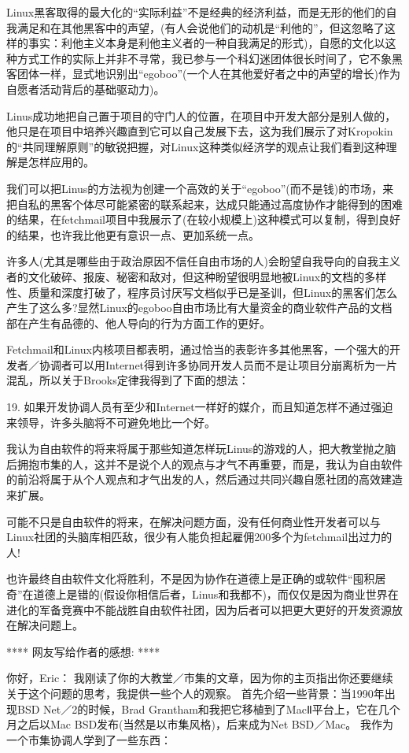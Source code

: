 \documentclass[a4paper,12pt,UTF8,twoside]{ctexbook}
\begin{document}
Linux黑客取得的最大化的“实际利益”不是经典的经济利益，而是无形的他们的自我满足和在其他黑客中的声望，(有人会说他们的动机是“利他的”，但这忽略了这样的事实：利他主义本身是利他主义者的一种自我满足的形式)，自愿的文化以这种方式工作的实际上并非不寻常，我已参与一个科幻迷团体很长时间了，它不象黑客团体一样，显式地识别出“egoboo”(一个人在其他爱好者之中的声望的增长)作为自愿者活动背后的基础驱动力)。


Linus成功地把自己置于项目的守门人的位置，在项目中开发大部分是别人做的，他只是在项目中培养兴趣直到它可以自己发展下去，这为我们展示了对Kropokin的“共同理解原则”的敏锐把握，对Linux这种类似经济学的观点让我们看到这种理解是怎样应用的。


我们可以把Linus的方法视为创建一个高效的关于“egoboo”(而不是钱)的市场，来把自私的黑客个体尽可能紧密的联系起来，达成只能通过高度协作才能得到的困难的结果，在fetchmail项目中我展示了(在较小规模上)这种模式可以复制，得到良好的结果，也许我比他更有意识一点、更加系统一点。


许多人(尤其是哪些由于政治原因不信任自由市场的人)会盼望自我导向的自我主义者的文化破碎、报废、秘密和敌对，但这种盼望很明显地被Linux的文档的多样性、质量和深度打破了，程序员讨厌写文档似乎已是圣训，但Linux的黑客们怎么产生了这么多?显然Linux的egoboo自由市场比有大量资金的商业软件产品的文档部在产生有品德的、他人导向的行为方面工作的更好。


Fetchmail和Linux内核项目都表明，通过恰当的表彰许多其他黑客，一个强大的开发者／协调者可以用Internet得到许多协同开发人员而不是让项目分崩离析为一片混乱，所以关于Brooks定律我得到了下面的想法：


19. 如果开发协调人员有至少和Internet一样好的媒介，而且知道怎样不通过强迫来领导，许多头脑将不可避免地比一个好。


我认为自由软件的将来将属于那些知道怎样玩Linus的游戏的人，把大教堂抛之脑后拥抱市集的人，这并不是说个人的观点与才气不再重要，而是，我认为自由软件的前沿将属于从个人观点和才气出发的人，然后通过共同兴趣自愿社团的高效建造来扩展。


可能不只是自由软件的将来，在解决问题方面，没有任何商业性开发者可以与Linux社团的头脑库相匹敌，很少有人能负担起雇佣200多个为fetchmail出过力的人!


也许最终自由软件文化将胜利，不是因为协作在道德上是正确的或软件“囤积居奇”在道德上是错的(假设你相信后者，Linus和我都不)，而仅仅是因为商业世界在进化的军备竞赛中不能战胜自由软件社团，因为后者可以把更大更好的开发资源放在解决问题上。

**** 网友写给作者的感想: ****

你好，Eric：
我刚读了你的大教堂／市集的文章，因为你的主页指出你还要继续关于这个问题的思考，我提供一些个人的观察。 首先介绍一些背景：当1990年出现BSD Net／2的时候，Brad Grantham和我把它移植到了MacⅡ平台上，它在几个月之后以Mac BSD发布(当然是以市集风格)，后来成为Net BSD／Mac。 我作为一个市集协调人学到了一些东西：
\end{document}
